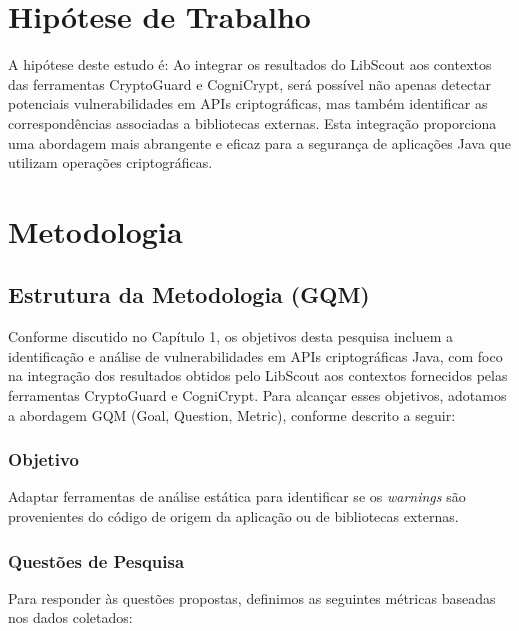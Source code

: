 \section{Hipótese de Trabalho}

A hipótese deste estudo é: Ao integrar os resultados do LibScout aos contextos das ferramentas CryptoGuard e CogniCrypt, será possível não apenas detectar potenciais vulnerabilidades em APIs criptográficas, mas também identificar as correspondências associadas a bibliotecas externas. Esta integração proporciona uma abordagem mais abrangente e eficaz para a segurança de aplicações Java que utilizam operações criptográficas.

\section{Metodologia}

\subsection{Estrutura da Metodologia (GQM)}

Conforme discutido no Capítulo 1, os objetivos desta pesquisa incluem a identificação e análise de vulnerabilidades em APIs criptográficas Java, com foco na integração dos resultados obtidos pelo LibScout aos contextos fornecidos pelas ferramentas CryptoGuard e CogniCrypt. Para alcançar esses objetivos, adotamos a abordagem GQM (Goal, Question, Metric), conforme descrito a seguir:

\subsubsection{Objetivo}
Adaptar ferramentas de análise estática para identificar se os \textit{warnings} são provenientes do código de origem da aplicação ou de bibliotecas externas.

\subsubsection{Questões de Pesquisa}
Para responder às questões propostas, definimos as seguintes métricas baseadas nos dados coletados:


